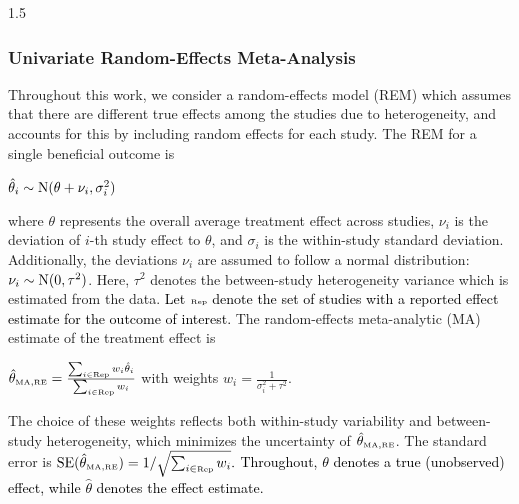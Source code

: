 \documentclass{article}
\newcommand{\mycolor}[1]{\textcolor{black}{#1}}
\begin{document}
\begin{spacing}{1.5}
\subsubsection{Univariate Random-Effects Meta-Analysis} \label{REM}
Throughout this work, we consider a random-effects model (REM) which assumes that there are different true effects among the studies due to heterogeneity, and accounts for this by including random effects for each study. The REM for a single beneficial outcome is
\begin{center}
$\hat\theta_i \sim \operatorname{N}(\theta + \nu_i, \sigma^{2}_i)$
\end{center}
where $\theta$ represents the overall average treatment effect across studies, $\nu_i$ is the deviation of $i$-th study effect to $\theta$, and $\sigma_i$ is the within-study standard deviation. Additionally, the deviations $\nu_i$ are assumed to follow a normal distribution:
$\nu_i \sim \operatorname{N}(0, \tau^2)$.
Here, $\tau^2$ denotes the between-study heterogeneity variance which is estimated from the data. \mycolor{Let $\mbox{\tiny{Rep}}$ denote the set of studies with a reported effect estimate for the outcome of interest.} The random-effects meta-analytic (MA) estimate of the treatment effect is 
\begin{center}
$\hat\theta_{\tiny{\mbox{MA}}, \mbox{\tiny{RE}}} = \frac{\sum_{i \in \mbox{\tiny{Rep}}} w_i \hat \theta_i}{\sum_{i \in \mbox{\tiny{Rep}}} w_i}$ with weights $w_i = \frac{1}{\sigma^{2}_i + \tau^2}$.
\end{center}

The choice of these weights reflects both within-study variability and between-study heterogeneity, which minimizes the uncertainty of $\hat\theta_{\tiny{\mbox{MA}}, \mbox{\tiny{RE}}}$.  The standard error is $\mbox{{SE}}(\hat\theta_{\tiny{\mbox{MA}}, \mbox{\tiny{RE}}}) = 1/{\sqrt{\sum_{i \in \mbox{\tiny{Rep}}} w_i}}.$ \mycolor{Throughout, $\theta$ denotes a true (unobserved) effect, while $\hat\theta$ denotes the effect estimate.}


\end{spacing}
\end{document}
